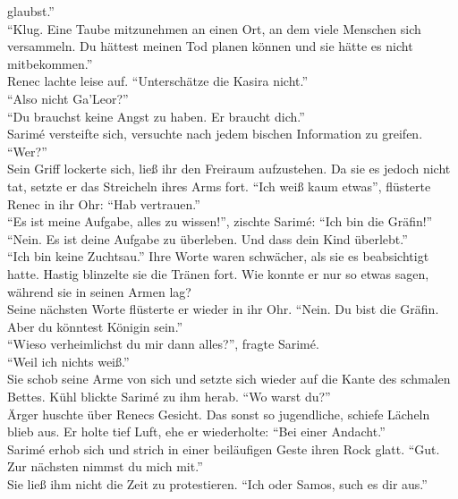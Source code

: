glaubst.''\\
``Klug. Eine Taube mitzunehmen an einen Ort, an dem viele Menschen sich versammeln. Du hättest 
meinen Tod planen können und sie hätte es nicht mitbekommen.''\\
Renec lachte leise auf. ``Unterschätze die Kasira nicht.''\\
``Also nicht Ga'Leor?''\\
``Du brauchst keine Angst zu haben. Er braucht dich.''\\
Sarimé versteifte sich, versuchte nach jedem bischen Information zu greifen. ``Wer?''\\
Sein Griff lockerte sich, ließ ihr den Freiraum aufzustehen. Da sie es jedoch nicht tat, setzte er 
das Streicheln ihres Arms fort. ``Ich weiß kaum etwas'', flüsterte Renec in ihr Ohr: ``Hab 
vertrauen.''\\
``Es ist meine Aufgabe, alles zu wissen!'', zischte Sarimé: ``Ich bin die Gräfin!''\\
``Nein. Es ist deine Aufgabe zu überleben. Und dass dein Kind überlebt.''\\
``Ich bin keine Zuchtsau.'' Ihre Worte waren schwächer, als sie es beabsichtigt hatte. Hastig 
blinzelte sie die Tränen fort. Wie konnte er nur so etwas sagen, während sie in seinen Armen lag?\\
Seine nächsten Worte flüsterte er wieder in ihr Ohr. ``Nein. Du bist die Gräfin. Aber du könntest 
Königin sein.''\\
``Wieso verheimlichst du mir dann alles?'', fragte Sarimé.\\
``Weil ich nichts weiß.''\\
Sie schob seine Arme von sich und setzte sich wieder auf die Kante des schmalen Bettes. Kühl 
blickte Sarimé zu ihm herab. ``Wo warst du?''\\
Ärger huschte über Renecs  Gesicht. Das sonst so jugendliche, schiefe Lächeln blieb aus. Er holte 
tief Luft, ehe er wiederholte: ``Bei einer Andacht.''\\
Sarimé erhob sich und strich in einer beiläufigen Geste ihren Rock glatt. ``Gut. Zur nächsten 
nimmst du mich mit.''\\
Sie ließ ihm nicht die Zeit zu protestieren. ``Ich oder Samos, such es dir aus.''\\








